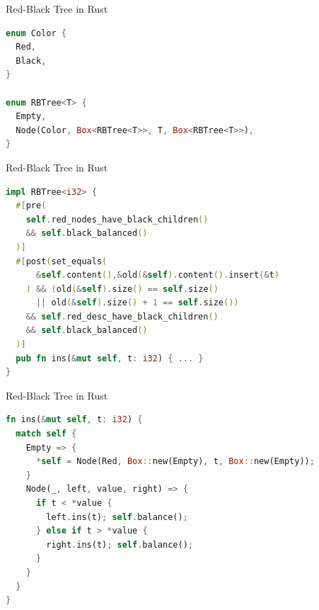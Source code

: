 \begin{frame}[fragile]{Red-Black Tree in Rust}
\begin{lstlisting}[language=Rust, caption={Data types with heap allocation}]
enum Color {
  Red,
  Black,
}

enum RBTree<T> {
  Empty,
  Node(Color, Box<RBTree<T>>, T, Box<RBTree<T>>),
}
\end{lstlisting}
\end{frame}


\begin{frame}[fragile]{Red-Black Tree in Rust}
\begin{lstlisting}[language=Rust, caption={Insert method with specification}]
impl RBTree<i32> {
  #[pre(
    self.red_nodes_have_black_children()
    && self.black_balanced()
  )]
  #[post(set_equals(
      &self.content(),&old(&self).content().insert(&t)
    ) && (old(&self).size() == self.size()
      || old(&self).size() + 1 == self.size())
    && self.red_desc_have_black_children()
    && self.black_balanced()
  )]
  pub fn ins(&mut self, t: i32) { ... }
}
\end{lstlisting}
\end{frame}

\begin{frame}[fragile]{Red-Black Tree in Rust}
\begin{lstlisting}[language=Rust, caption={Recursive insertion}]
fn ins(&mut self, t: i32) {
  match self {
    Empty => {
      *self = Node(Red, Box::new(Empty), t, Box::new(Empty));
    }
    Node(_, left, value, right) => {
      if t < *value {
        left.ins(t); self.balance();
      } else if t > *value {
        right.ins(t); self.balance();
      }
    }
  }
}
\end{lstlisting}
\end{frame}

